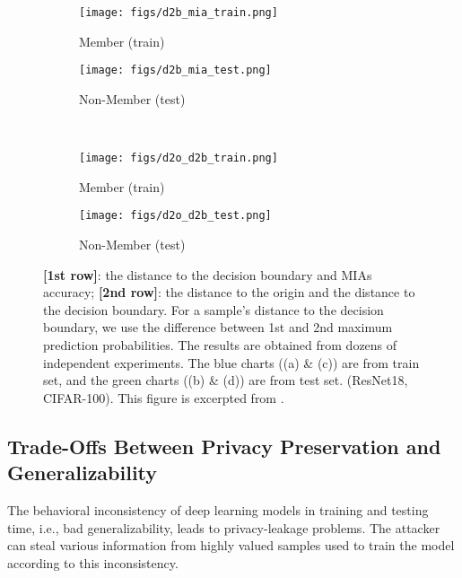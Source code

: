 \begin{figure}[t]
\begin{center}
\begin{subfigure}[b]{0.19\textwidth}
   \centering
   \texttt{[image: figs/d2b\_mia\_train.png]}
   \caption{Member (train)}
   \label{fig:d2db_mia_train}
\end{subfigure}
\quad
\begin{subfigure}[b]{0.19\textwidth}
    \centering
   \texttt{[image: figs/d2b\_mia\_test.png]}
   \caption{Non-Member (test)}
   \label{fig:d2db_mia_test}
\end{subfigure}
\\
\begin{subfigure}[b]{0.19\textwidth}
         \centering
   \texttt{[image: figs/d2o\_d2b\_train.png]}
   \caption{Member (train)}
   \label{fig:d2o_d2db_train}
\end{subfigure}
\quad
\begin{subfigure}[b]{0.19\textwidth}
         \centering
   \texttt{[image: figs/d2o\_d2b\_test.png]}
   \caption{Non-Member (test)}
   \label{fig:d2o_d2db_test}
\end{subfigure}
\end{center}
\caption{\textbf{[1st row]}: the distance to the decision boundary and MIAs accuracy; \textbf{[2nd row]}: the distance to the origin and the distance to the decision boundary. For a sample's distance to the decision boundary, we use the difference between 1st and 2nd maximum prediction probabilities. The results are obtained from dozens of independent experiments. The blue charts ((a) \& (c)) are from train set, and the green charts ((b) \& (d)) are from test set. (ResNet18, CIFAR-100). This figure is excerpted from \protect\cite{fang2024representation}.}
\vspace{-0.1cm}
\label{fig:d2o_d2db_mia}
\end{figure}




\subsection{Trade-Offs Between Privacy Preservation and Generalizability}

The behavioral inconsistency of deep learning models in training and testing time, i.e., bad generalizability, leads to privacy-leakage problems. The attacker can steal various information from highly valued samples used to train the model according to this inconsistency. 


